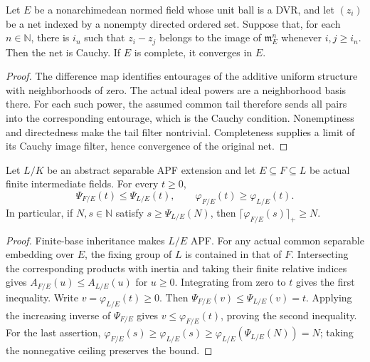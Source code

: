 \begin{lemma}
\label{fw:ideal-power-cauchy-criterion}
\leanok
Let $E$ be a nonarchimedean normed field whose unit ball is a
DVR, and let $(z_i)$ be a net indexed by a nonempty directed
ordered set. Suppose that, for each $n\in\mathbb N$, there is
$i_n$ such that $z_i-z_j$ belongs to the image of
$\mathfrak m_E^n$ whenever $i,j\geq i_n$.
Then the net is Cauchy. If $E$ is complete, it converges in $E$.
\end{lemma}
\begin{proof}
The difference map identifies entourages of the additive uniform
structure with neighborhoods of zero. The actual ideal powers
are a neighborhood basis there. For each such power, the assumed
common tail therefore sends all pairs into the corresponding
entourage, which is the Cauchy condition.
Nonemptiness and directedness make the tail filter nontrivial.
Completeness supplies a limit of its Cauchy image filter, hence
convergence of the original net.
\end{proof}

\begin{lemma}
\label{fw:apf-herbrand-continuity-control}
\leanok
Let $L/K$ be an abstract separable APF extension and let
$E\subseteq F\subseteq L$ be actual finite intermediate fields.
For every $t\geq0$,
\[
 \Psi_{F/E}(t)\leq\Psi_{L/E}(t),\qquad
 \varphi_{F/E}(t)\geq\varphi_{L/E}(t).
\]
In particular, if $N,s\in\mathbb N$ satisfy
$s\geq\Psi_{L/E}(N)$, then
$\lceil\varphi_{F/E}(s)\rceil_+\geq N$.
\end{lemma}
\begin{proof}
Finite-base inheritance makes $L/E$ APF.
For any actual common separable embedding over $E$, the fixing
group of $L$ is contained in that of $F$. Intersecting the
corresponding products with inertia and taking their finite
relative indices gives $A_{F/E}(u)\leq A_{L/E}(u)$ for $u\geq0$.
Integrating from zero to $t$ gives the first inequality.
Write $v=\varphi_{L/E}(t)\geq0$. Then
$\Psi_{F/E}(v)\leq\Psi_{L/E}(v)=t$.
Applying the increasing inverse of $\Psi_{F/E}$ gives
$v\leq\varphi_{F/E}(t)$, proving the second inequality.
For the last assertion,
$\varphi_{F/E}(s)\geq\varphi_{L/E}(s)
\geq\varphi_{L/E}(\Psi_{L/E}(N))=N$;
taking the nonnegative ceiling preserves the bound.
\end{proof}

